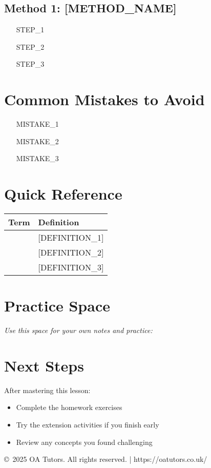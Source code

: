 \documentclass[a4paper,12pt]{article}
\begin{document}
\subsection{Method 1: [METHOD_NAME]}
\begin{enumerate}
    \item [STEP_1]
    \item [STEP_2]
    \item [STEP_3]
\end{enumerate}

\begin{tip}
\end{tip}

\section{Common Mistakes to Avoid}
\begin{itemize}
    \item [MISTAKE_1]
    \item [MISTAKE_2]
    \item [MISTAKE_3]
\end{itemize}

\section{Quick Reference}
\begin{center}
\begin{tabular}{|l|l|}
\hline
\textbf{Term} & \textbf{Definition} \\
\hline
[TERM_1] & [DEFINITION_1] \\
\hline
[TERM_2] & [DEFINITION_2] \\
\hline
[TERM_3] & [DEFINITION_3] \\
\hline
\end{tabular}
\end{center}

\section{Practice Space}
\textit{Use this space for your own notes and practice:}

\vspace{3cm}

\section{Next Steps}
After mastering this lesson:
\begin{itemize}
    \item Complete the homework exercises
    \item Try the extension activities if you finish early
    \item Review any concepts you found challenging
\end{itemize}

\vfill
\begin{center}
\textcolor{oagray}{\small \copyright\ 2025 OA Tutors. All rights reserved. | https://oatutors.co.uk/}
\end{center}
\end{document}
